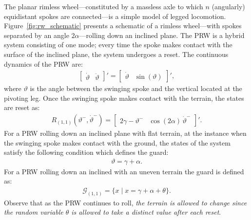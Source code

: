 \begin{example}
\label{example:rw}
The planar rimless wheel---constituted by a massless axle to which $n$ (angularly) equidistant spokes are connected---is a simple model of legged locomotion.
Figure~\ref{fig:rw_schematic} presents a schematic of a rimless wheel---with spokes separated by an angle $2\alpha$---rolling down an inclined plane. 
The PRW is a hybrid system consisting of one mode; every time the spoke makes contact with the surface of the inclined plane, the system undergoes a reset.
The continuous dynamics of the PRW are:
\begin{align}
  \begin{bmatrix}
    \dot \vartheta& \ddot\vartheta
  \end{bmatrix}'=\begin{bmatrix}
    \dot\vartheta&\sin(\vartheta)
  \end{bmatrix}',
\end{align}
where $\vartheta$ is the angle between the swinging spoke and the vertical located at the pivoting leg. Once the swinging spoke makes contact with the terrain, the states are reset as:
\begin{align}
R_{(1,1)}(\vartheta^-,\dot \vartheta^-)=\begin{bmatrix}
    2\gamma-\vartheta^-&
    \cos(2\alpha)\,\dot\vartheta^-
  \end{bmatrix}'.
\end{align}
For a PRW rolling down an inclined plane with flat terrain, at the instance when the swinging spoke makes contact with the ground, the states of the system satisfy the following condition which defines the guard:
\begin{align}
\vartheta = \gamma+\alpha.
\end{align}
For a PRW rolling down an inclined with an uneven terrain the guard is defined as:
\begin{align}
\mathcal G_{(1,1)}=\{x\mid x=\gamma+\alpha+\theta\}.
\end{align}
Observe that as the PRW continues to roll, \emph{the terrain is allowed to change since the random variable $\theta$ is allowed to take a distinct value after each reset}.
\end{example}

